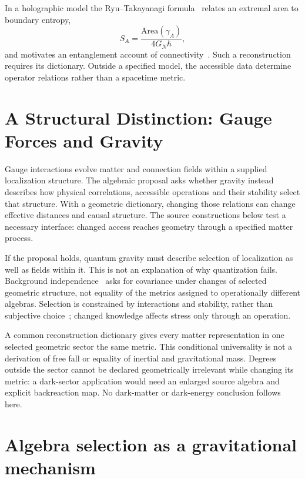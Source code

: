 In a holographic model the Ryu--Takayanagi formula~\cite{RyuTakayanagi2006} relates an extremal area to boundary entropy,
\begin{equation}
S_A = \frac{\text{Area}(\gamma_A)}{4 G_N \hbar},
\end{equation}
and motivates an entanglement account of connectivity~\cite{VanRaamsdonk2010}.
Such a reconstruction requires its dictionary. Outside a specified model,
the accessible data determine operator relations rather than a spacetime metric.

\section{A Structural Distinction: Gauge Forces and Gravity}
\label{sec:distinction}

Gauge interactions evolve matter and connection fields within a supplied localization structure. The algebraic proposal asks whether gravity instead describes how physical correlations, accessible operations and their stability select that structure. With a geometric dictionary, changing those relations can change effective distances and causal structure. The source constructions below test a necessary interface: changed access reaches geometry through a specified matter process.

If the proposal holds, quantum gravity must describe selection of localization as well as fields within it. This is not an explanation of why quantization fails. Background independence~\cite{Rovelli2004,Smolin2006} asks for covariance under changes of selected geometric structure, not equality of the metrics assigned to operationally different algebras. Selection is constrained by interactions and stability, rather than subjective choice~\cite{Liu2026PaperB}; changed knowledge affects stress only through an operation.

A common reconstruction dictionary gives every matter representation in one selected geometric sector the same metric. This conditional universality is not a derivation of free fall or equality of inertial and gravitational mass. Degrees outside the sector cannot be declared geometrically irrelevant while changing its metric: a dark-sector application would need an enlarged source algebra and explicit backreaction map. No dark-matter or dark-energy conclusion follows here.

\section{Algebra selection as a gravitational mechanism}
\label{sec:technical}

